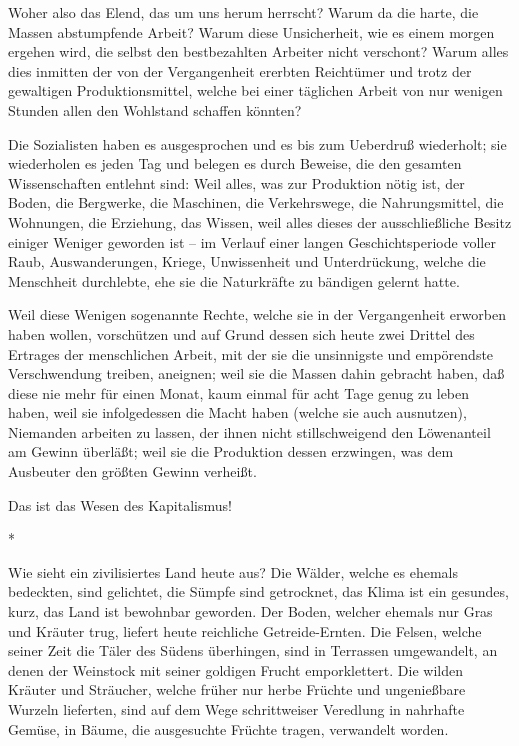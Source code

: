 \documentclass{scrbook}
\begin{document}
Woher also das Elend, das um uns herum herrscht? Warum da die harte, die Massen abstumpfende Arbeit? Warum diese Unsicherheit, wie es einem morgen ergehen wird, die selbst den bestbezahlten Arbeiter nicht verschont? Warum alles dies inmitten der von der Vergangenheit ererbten Reichtümer und trotz der gewaltigen Produktionsmittel, welche bei einer täglichen Arbeit von nur wenigen Stunden allen den Wohlstand schaffen könnten?

Die Sozialisten haben es ausgesprochen und es bis zum Ueberdruß wiederholt; sie wiederholen es jeden Tag und belegen es durch Beweise, die den gesamten Wissenschaften entlehnt sind: Weil alles, was zur Produktion nötig ist, der Boden, die Bergwerke, die Maschinen, die Verkehrswege, die Nahrungsmittel, die Wohnungen, die Erziehung, das Wissen, weil alles dieses der ausschließliche Besitz einiger Weniger geworden ist – im Verlauf einer langen Geschichtsperiode voller Raub, Auswanderungen, Kriege, Unwissenheit und Unterdrückung, welche die Menschheit durchlebte, ehe sie die Naturkräfte zu bändigen gelernt hatte.

Weil diese Wenigen sogenannte Rechte, welche sie in der Vergangenheit erworben haben wollen, vorschützen und auf Grund dessen sich heute zwei Drittel des Ertrages der menschlichen Arbeit, mit der sie die unsinnigste und empörendste Verschwendung treiben, aneignen; weil sie die Massen dahin gebracht haben, daß diese nie mehr für einen Monat, kaum einmal für acht Tage genug zu leben haben, weil sie infolgedessen die Macht haben (welche sie auch ausnutzen), Niemanden arbeiten zu lassen, der ihnen nicht stillschweigend den Löwenanteil am Gewinn überläßt; weil sie die Produktion dessen erzwingen, was dem Ausbeuter den größten Gewinn verheißt.

Das ist das Wesen des Kapitalismus!

\begin{center}*\end{center}

Wie sieht ein zivilisiertes Land heute aus? Die Wälder, welche es ehemals bedeckten, sind gelichtet, die Sümpfe sind getrocknet, das Klima ist ein gesundes, kurz, das Land ist bewohnbar geworden. Der Boden, welcher ehemals nur Gras und Kräuter trug, liefert heute reichliche Getreide-Ernten. Die Felsen, welche seiner Zeit die Täler des Südens überhingen, sind in Terrassen umgewandelt, an denen der Weinstock mit seiner goldigen Frucht emporklettert. Die wilden Kräuter und Sträucher, welche früher nur herbe Früchte und ungenießbare Wurzeln lieferten, sind auf dem Wege schrittweiser Veredlung in nahrhafte Gemüse, in Bäume, die ausgesuchte Früchte tragen, verwandelt worden.
\end{document}
